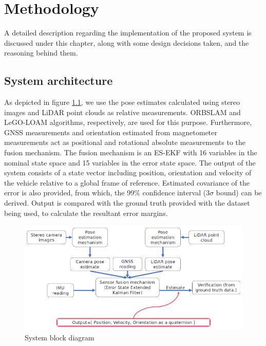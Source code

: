 \chapter{Methodology}
A detailed description regarding the implementation of the proposed system is discussed under this chapter, along with some design decisions taken, and the reasoning behind them.




\section{System architecture}
\label{sec:SystemArchitecture}
As depicted in figure \ref{fig:pa:systemBlockDiagram}, we use the pose estimates calculated using stereo images and \gls{LiDAR} point clouds as relative measurements. \gls{ORBSLAM} and \gls{LeGO-LOAM} algorithms, respectively, are used for this purpose. Furthermore, \gls{GNSS} measurements and orientation estimated from magnetometer measurements act as positional and rotational absolute measurements to the fusion mechanism. The fusion mechanism is an \gls{ES-EKF} with 16 variables in the nominal state space and 15 variables in the error state space. The output of the system consists of a state vector including position, orientation and velocity of the vehicle relative to a global frame of reference. Estimated covariance of the error is also provided, from which, the 99\% confidence interval ($3\sigma$ bound) can be derived. Output is compared with the ground truth provided with the dataset being used, to calculate the resultant error margins.
\begin{figure}[htp]
	\begin{center}
	\includegraphics[width=\textwidth]{figs/system-block-diagram.png}
	\end{center}
	\vspace{-0.5cm}
	\caption{System block diagram}
	\label{fig:pa:systemBlockDiagram}
	\vspace{0.5cm}
\end{figure}

